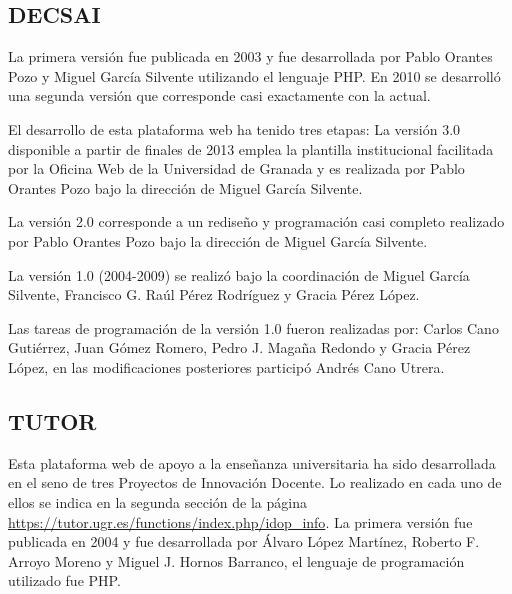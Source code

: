 \subsection{DECSAI}

La primera versión fue publicada en 2003 y fue desarrollada por Pablo Orantes Pozo y Miguel García Silvente utilizando el lenguaje PHP. En 2010 se desarrolló una segunda versión que corresponde casi exactamente con la actual.

\bigskip
El desarrollo de esta plataforma web ha tenido tres etapas: 
La versión 3.0 disponible a partir de finales de 2013 emplea la plantilla institucional facilitada por la Oficina Web de la Universidad de Granada y es realizada por Pablo Orantes Pozo bajo la dirección de Miguel García Silvente.

\bigskip
La versión 2.0 corresponde a un rediseño y programación casi completo realizado por Pablo Orantes Pozo bajo la dirección de Miguel García Silvente.

\bigskip
La versión 1.0 (2004-2009) se realizó bajo la coordinación de Miguel García Silvente, Francisco G. Raúl Pérez Rodríguez y Gracia Pérez López.

\bigskip
Las tareas de programación de la versión 1.0 fueron realizadas por: Carlos Cano Gutiérrez, Juan Gómez Romero, Pedro J. Magaña Redondo y Gracia Pérez López, en las modificaciones posteriores participó Andrés Cano Utrera.

\subsection{TUTOR}
Esta plataforma web de apoyo a la enseñanza universitaria ha sido desarrollada en el seno de tres Proyectos de Innovación Docente. Lo realizado en cada uno de ellos se indica en la segunda sección de la página \url{https://tutor.ugr.es/functions/index.php/idop_info}. La primera versión fue publicada en 2004 y fue desarrollada por Álvaro López Martínez, Roberto F. Arroyo Moreno y Miguel J. Hornos Barranco, el lenguaje de programación utilizado fue PHP.

